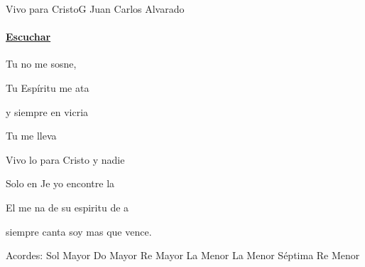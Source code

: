 \documentclass[12pt, spanish]{book}
\newcommand{\NotCCLIed}{\relax}
\begin{document}
    \begin{song}{Vivo para Cristo}{G}
        {} %
        {Juan Carlos Alvarado}
        {} %
        {} %
        \ifChordBk
        \paragraph{\mbox{}\hfill\protect\href{https://open.spotify.com/intl-es/track/2dK0Ld3YAGwIFDPNrrhsuK}{Escuchar}\mbox{}\hfill}
        \fi



        \begin{SBChorus}
            Tu no me sosne,

            Tu Espíritu me ata

            y siempre en vicria

            Tu me lleva
        \end{SBChorus}

        \begin{SBOpGroup}
            Vivo lo para Cristo y nadie 

            Solo en Je yo encontre la 

            El me na de su espiritu de a

            siempre canta soy mas que vence.
        \end{SBOpGroup}

        \ifChordBk
        \begin{SBOpGroup}
            Acordes:\break
            \upchord{\G}\qquad Sol Mayor \hfill
            \upchord{\C}\qquad Do Mayor \hfill\null\break
            \upchord{\D}\qquad Re Mayor \hfill
            \upchord{\Am}\qquad La Menor \hfill\null\break
            \upchord{\Amseven}\qquad La Menor S\'eptima \hfill
            \upchord{\Dm}\qquad Re Menor \hfill\null\break
        \end{SBOpGroup}
        \fi
    \end{song}
\end{document}
